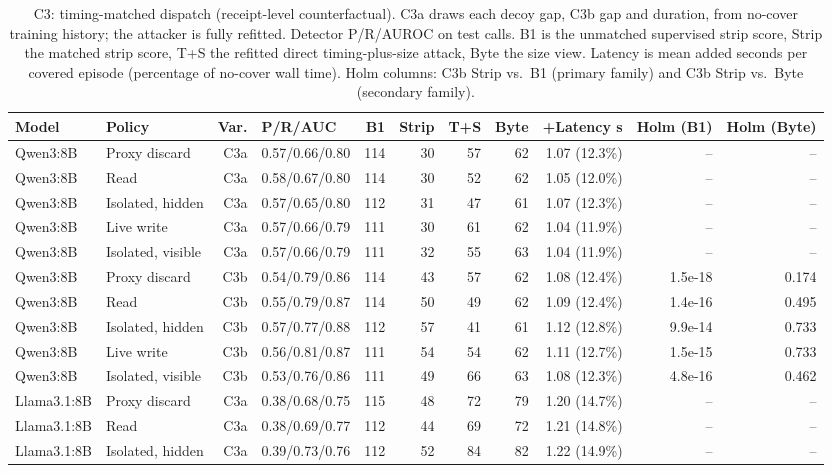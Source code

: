 \begin{table}[t]\centering\small
\caption{C3: timing-matched dispatch (receipt-level counterfactual). C3a draws each decoy gap, C3b gap and duration, from no-cover training history; the attacker is fully refitted. Detector P/R/AUROC on test calls. B1 is the unmatched supervised strip score, Strip the matched strip score, T+S the refitted direct timing-plus-size attack, Byte the size view. Latency is mean added seconds per covered episode (percentage of no-cover wall time). Holm columns: C3b Strip vs.\ B1 (primary family) and C3b Strip vs.\ Byte (secondary family).}\label{tab:c3}
\setlength{\tabcolsep}{4pt}
\begin{tabularx}{\textwidth}{@{}llrYrrrrrrr@{}}\toprule
Model & Policy & Var. & P/R/AUC & B1 & Strip & T+S & Byte & +Latency s & Holm (B1) & Holm (Byte)\\\midrule
Qwen3:8B & Proxy discard & C3a & 0.57/0.66/0.80 & 114 & 30 & 57 & 62 & 1.07 (12.3\%) & -- & -- \\
Qwen3:8B & Read & C3a & 0.58/0.67/0.80 & 114 & 30 & 52 & 62 & 1.05 (12.0\%) & -- & -- \\
Qwen3:8B & Isolated, hidden & C3a & 0.57/0.65/0.80 & 112 & 31 & 47 & 61 & 1.07 (12.3\%) & -- & -- \\
Qwen3:8B & Live write & C3a & 0.57/0.66/0.79 & 111 & 30 & 61 & 62 & 1.04 (11.9\%) & -- & -- \\
Qwen3:8B & Isolated, visible & C3a & 0.57/0.66/0.79 & 111 & 32 & 55 & 63 & 1.04 (11.9\%) & -- & -- \\
Qwen3:8B & Proxy discard & C3b & 0.54/0.79/0.86 & 114 & 43 & 57 & 62 & 1.08 (12.4\%) & 1.5e-18 & 0.174 \\
Qwen3:8B & Read & C3b & 0.55/0.79/0.87 & 114 & 50 & 49 & 62 & 1.09 (12.4\%) & 1.4e-16 & 0.495 \\
Qwen3:8B & Isolated, hidden & C3b & 0.57/0.77/0.88 & 112 & 57 & 41 & 61 & 1.12 (12.8\%) & 9.9e-14 & 0.733 \\
Qwen3:8B & Live write & C3b & 0.56/0.81/0.87 & 111 & 54 & 54 & 62 & 1.11 (12.7\%) & 1.5e-15 & 0.733 \\
Qwen3:8B & Isolated, visible & C3b & 0.53/0.76/0.86 & 111 & 49 & 66 & 63 & 1.08 (12.3\%) & 4.8e-16 & 0.462 \\
Llama3.1:8B & Proxy discard & C3a & 0.38/0.68/0.75 & 115 & 48 & 72 & 79 & 1.20 (14.7\%) & -- & -- \\
Llama3.1:8B & Read & C3a & 0.38/0.69/0.77 & 112 & 44 & 69 & 72 & 1.21 (14.8\%) & -- & -- \\
Llama3.1:8B & Isolated, hidden & C3a & 0.39/0.73/0.76 & 112 & 52 & 84 & 82 & 1.22 (14.9\%) & -- & -- \\

\end{tabularx}
\end{table}
